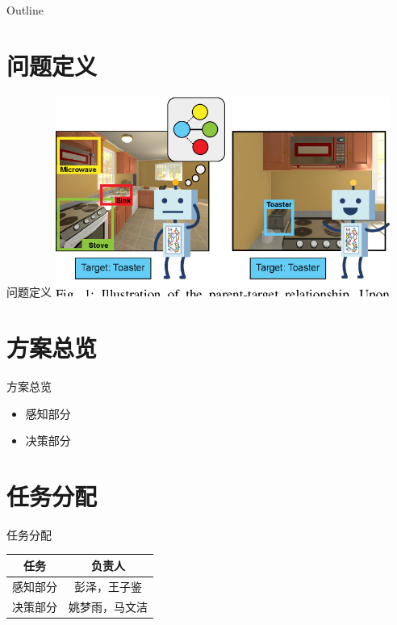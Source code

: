 \begin{frame}{Outline}
    \tableofcontents
\end{frame}

\section{问题定义}
\begin{frame}{问题定义}
    \centering
    \includegraphics[width=11cm,trim=0 20 0 0,clip]{assets/problem.png}
\end{frame}



\section{方案总览}
\begin{frame}{方案总览}
    \begin{itemize}
        \item 感知部分
        \item 决策部分
    \end{itemize}
\end{frame}

\section{任务分配}
\begin{frame}{任务分配}
    \begin{table}[h]
        \centering
        \begin{tabular}{cc}
            \toprule
            任务 & 负责人\\
            \midrule
            感知部分 & 彭泽，王子鉴\\
            决策部分 & 姚梦雨，马文洁\\
            \bottomrule
        \end{tabular}
    \end{table}
\end{frame}
